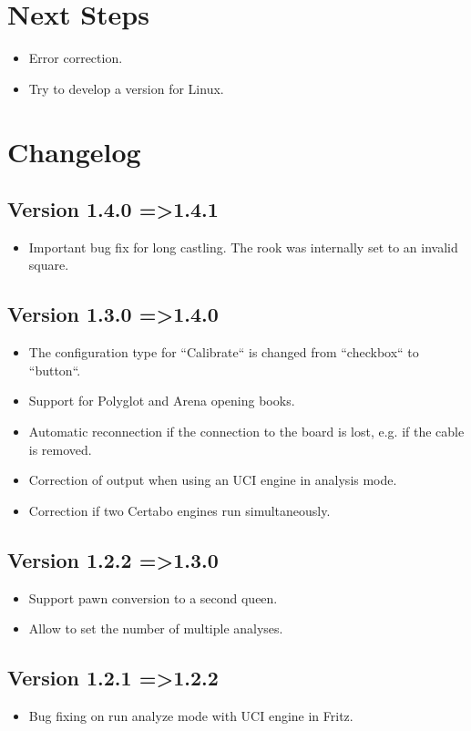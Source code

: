 \documentclass[11pt,a4paper]{article}
\begin{document}
\section{Next Steps}
\begin{itemize}
	\item Error correction.
	\item Try to develop a version for Linux.
\end{itemize}

\pagebreak

\section{Changelog}
\subsection{Version 1.4.0 =\textgreater 1.4.1}
\begin{itemize}
	    \item Important bug fix for long castling. The rook was internally set to an invalid square.
\end{itemize}
\subsection{Version 1.3.0 =\textgreater 1.4.0}
\begin{itemize}
    \item The configuration type for ``Calibrate`` is changed from ``checkbox`` to ``button``.
	\item Support for Polyglot and Arena opening books.
    \item Automatic reconnection if the connection to the board is lost, e.g. if the cable is removed.
    \item Correction of output when using an UCI engine in analysis mode.
    \item Correction if two Certabo engines run simultaneously.
\end{itemize}
\subsection{Version 1.2.2 =\textgreater 1.3.0}
\begin{itemize}
	\item Support pawn conversion to a second queen.
	\item Allow to set the number of multiple analyses.
\end{itemize}
\subsection{Version 1.2.1 =\textgreater 1.2.2}
\begin{itemize}
	\item Bug fixing on run analyze mode with UCI engine in Fritz.
\end{itemize}
\end{document}
